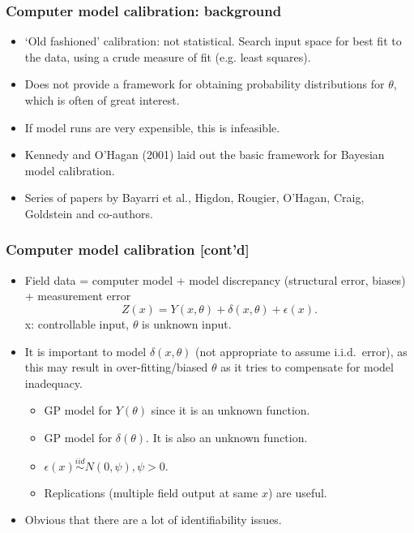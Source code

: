 \documentclass{beamer}
\begin{document}
\begin{frame}
  \frametitle{Computer model calibration: background }
  \begin{itemize}
  \item `Old fashioned' calibration: not statistical. Search input
    space for best fit to the data, using a crude measure of fit
    (e.g. least squares).
\item Does not provide a framework for obtaining probability
  distributions for $\theta$, which is often of great interest.
\item If model runs are very expensible, this is infeasible.
  \item Kennedy and O'Hagan (2001) laid out the basic framework for
    Bayesian model calibration. 
  \item Series of papers by Bayarri et al., Higdon, Rougier, O'Hagan,
    Craig, Goldstein and co-authors.
  \end{itemize}
\end{frame}

\begin{frame}
  \frametitle{Computer model calibration [cont'd] }
  \begin{itemize}
\item Field data = computer model + model discrepancy (structural
    error, biases) + measurement error
    $$ Z(x) = Y(x,\theta) + \delta(x,\theta) + \epsilon(x).$$
x: controllable input, $\theta$ is unknown input.
  \item It is important to model $\delta(x,\theta)$ (not appropriate to
    assume i.i.d.\ error), as this may result in over-fitting/biased
    $\theta$ as it tries to compensate for model inadequacy.%
\begin{itemize}
\item GP model for $Y(\theta)$ since it is an unknown function.
\item GP model for $\delta(\theta)$. It is also an unknown function.
\item $\epsilon(x) \stackrel{iid}{\sim} N(0,\psi), \psi > 0.$
\item Replications (multiple field output at same $x$) are useful.
  \end{itemize}
\item Obvious that there are a lot of identifiability issues.
  \end{itemize}
\end{frame}
\end{document}
